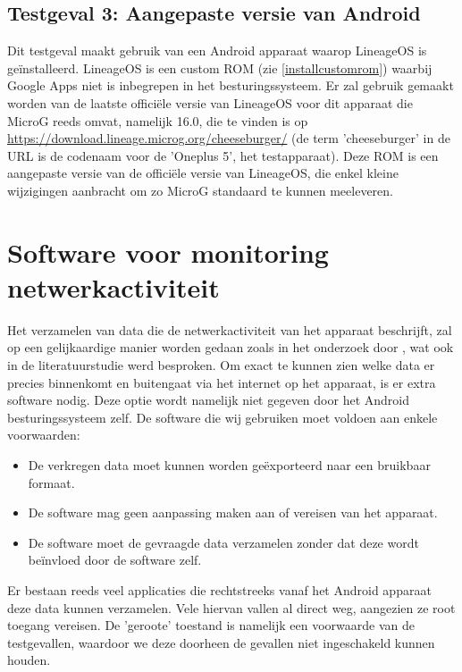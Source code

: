 \subsection{Testgeval 3: Aangepaste versie van Android}
\label{sec:testgeval3}
Dit testgeval maakt gebruik van een Android apparaat waarop LineageOS is geïnstalleerd. LineageOS is een custom ROM (zie \ref{installcustomrom}) waarbij Google Apps niet is inbegrepen in het besturingssysteem. Er zal gebruik gemaakt worden van de laatste officiële versie van LineageOS voor dit apparaat die MicroG reeds omvat, namelijk 16.0, die te vinden is op \url{https://download.lineage.microg.org/cheeseburger/} (de term 'cheeseburger' in de URL is de codenaam voor de 'Oneplus 5', het testapparaat). Deze ROM is een aangepaste versie van de officiële versie van LineageOS, die enkel kleine wijzigingen aanbracht om zo MicroG standaard te kunnen meeleveren.

\section{Software voor monitoring netwerkactiviteit}
\label{sec:metingsoftware}
Het verzamelen van data die de netwerkactiviteit van het apparaat beschrijft, zal op een gelijkaardige manier worden gedaan zoals in het onderzoek door \cite{schmidt_google-data-collection}, wat ook in de literatuurstudie werd besproken. Om exact te kunnen zien welke data er precies binnenkomt en buitengaat via het internet op het apparaat, is er extra software nodig. Deze optie wordt namelijk niet gegeven door het Android besturingssysteem zelf. De software die wij gebruiken moet voldoen aan enkele voorwaarden:
\begin{itemize}
    \item De verkregen data moet kunnen worden geëxporteerd naar een bruikbaar formaat.
    \item De software mag geen aanpassing maken aan of vereisen van het apparaat.
    \item De software moet de gevraagde data verzamelen zonder dat deze wordt beïnvloed door de software zelf.
\end{itemize}
Er bestaan reeds veel applicaties die rechtstreeks vanaf het Android apparaat deze data kunnen verzamelen. Vele hiervan vallen al direct weg, aangezien ze root toegang vereisen. De 'geroote' toestand is namelijk een voorwaarde van de testgevallen, waardoor we deze doorheen de gevallen niet ingeschakeld kunnen houden. 

